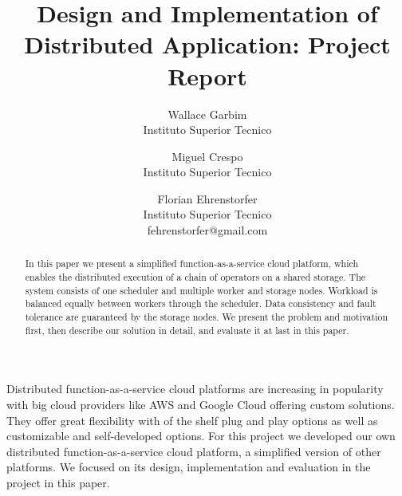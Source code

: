 \documentclass[times, 10pt,twocolumn]{article}
\begin{document}
\title{Design and Implementation of Distributed Application: Project Report}

\author{
Wallace Garbim\\Instituto Superior Tecnico\\
\and
Miguel Crespo\\Instituto Superior Tecnico\\
\and
Florian Ehrenstorfer\\
Instituto Superior Tecnico\\fehrenstorfer@gmail.com\\
}

\maketitle
\thispagestyle{empty}

\begin{abstract}
In this paper we present a simplified function-as-a-service cloud platform, which enables the distributed execution of a chain of operators on a shared storage. 
The system consists of one scheduler and multiple worker and storage nodes.
Workload is balanced equally between workers through the scheduler.
Data consistency and fault tolerance are guaranteed by the storage nodes.
We present the problem and motivation first, then describe our solution in detail, and evaluate it at last in this paper.
\end{abstract}
Distributed function-as-a-service cloud platforms are increasing in popularity with big cloud providers like AWS and Google Cloud offering custom solutions.
They offer great flexibility with of the shelf plug and play options as well as customizable and self-developed options.
For this project we developed our own distributed function-as-a-service cloud platform, a simplified version of other platforms.
We focused on its design, implementation and evaluation in the project in this paper.
\end{document}
